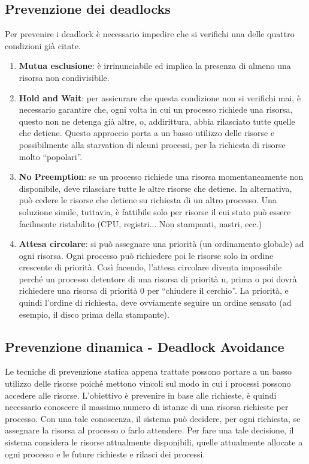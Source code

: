 \documentclass[a4paper]{article}
\begin{document}
\subsection{Prevenzione dei deadlocks}
Per prevenire i deadlock è necessario impedire che si verifichi una delle quattro condizioni già citate.
\begin{enumerate}
   \item \textbf{Mutua esclusione}: è irrinunciabile ed implica la presenza di almeno una risorsa non condivisibile.
   \item \textbf{Hold and Wait}: per assicurare che questa condizione non si verifichi mai, è necessario garantire che, ogni volta in cui un processo richiede una risorsa, questo non ne detenga già altre, o, addirittura, abbia rilasciato tutte quelle che detiene.
         Questo approccio porta a un basso utilizzo delle risorse e possibilmente alla starvation di alcuni processi, per la richiesta di risorse molto ``popolari''.
   \item \textbf{No Preemption}: se un processo richiede una risorsa momentaneamente non disponibile, deve rilasciare tutte le altre risorse che detiene. In alternativa, può cedere le risorse che detiene su richiesta di un altro processo. Una soluzione simile, tuttavia, è fattibile solo per risorse il cui stato può essere facilmente ristabilito (CPU, registri... Non stampanti, nastri, ecc.)
   \item \textbf{Attesa circolare}: si può assegnare una priorità (un ordinamento globale) ad ogni risorsa. Ogni processo può richiedere poi le risorse solo in ordine crescente di priorità. Così facendo, l'attesa circolare diventa impossibile perché un processo detentore di una risorsa di priorità n, prima o poi dovrà richiedere una risorsa di priorità 0 per ``chiudere il cerchio''. La priorità, e quindi l'ordine di richiesta, deve ovviamente seguire un ordine sensato (ad esempio, il disco prima della stampante).
\end{enumerate}

\subsection{Prevenzione dinamica - Deadlock Avoidance}
Le tecniche di prevenzione statica appena trattate possono portare a un basso utilizzo delle risorse poiché mettono vincoli sul modo in cui i processi possono accedere alle risorse. L'obiettivo è prevenire in base alle richieste, è quindi necessario conoscere il massimo numero di istanze di una risorsa richieste per processo. Con una tale conoscenza, il sistema può decidere, per ogni richiesta, se assegnare la risorsa al processo o farlo attendere. Per fare una tale decisione, il sistema considera le risorse attualmente disponibili, quelle attualmente allocate a ogni processo e le future richieste e rilasci dei processi.
\end{document}
